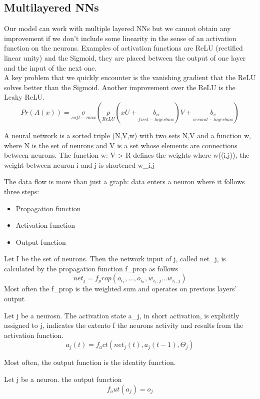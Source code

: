 \subsection{Multilayered NNs}
Our model can work with multiple layered NNs but we cannot obtain any improvement if we don't include some linearity in the sense of an activation function on the neurons. Examples of activation functions are ReLU (rectified linear unity) and the Sigmoid, they are placed between the output of one layer and the input of the next one.\\
A key problem that we quickly encounter is the vanishing gradient that the ReLU solves better than the Sigmoid. Another improvement over the ReLU is the Leaky ReLU.
\[ 
    Pr(A(x)) = \underset{soft-max}{\sigma} (\underset{ReLU}{\rho}(xU+\underset{first-layer bias}{b_u})V+\underset{second-layer bias}{b_v}) 
\]
\begin{definition}
    A neural network is a sorted triple (N,V,w) with two sets N,V and a function w, where N is the set of neurons and V is a set whose elements are connections between neurons. The function w: V-> R defines the weights where w((i,j)), the weight between neuron i and j is shortened w_{i,j}
\end{definition}
The data flow is more than just a graph: data enters a neuron where it follows three steps:
\begin{itemize}
    \item Propagation function
    \item Activation function
    \item Output function
\end{itemize}
\begin{definition}
    Let I be the set of neurons. Then the network input of j, called net_j, is calculated by the propagation function f_prop as follows
    \[ 
        net_j = f_prop(o_i_1,\ldots, o_i_n, w_{i_1,j} \ldots w_{i_1,j}) 
    \]
    Most often the f_prop is the weighted sum and operates on previous layers' output
\end{definition}
\begin{definition} Let j be a neurosn. The activation state a_j, in short activation, is explicitly assigned to j, indicates the extento f the neurons activity and results from the activation function.
    \[ 
        a_j(t) = f_act(net_j(t), a_j(t-1), \Theta_j) 
    \]
    
\end{definition}
Most often, the output function is the identity function.
\begin{definition}
    Let j be a neuron. the output function
    \[ 
        f_out(a_j)= o_j 
    \]
\end{definition}
